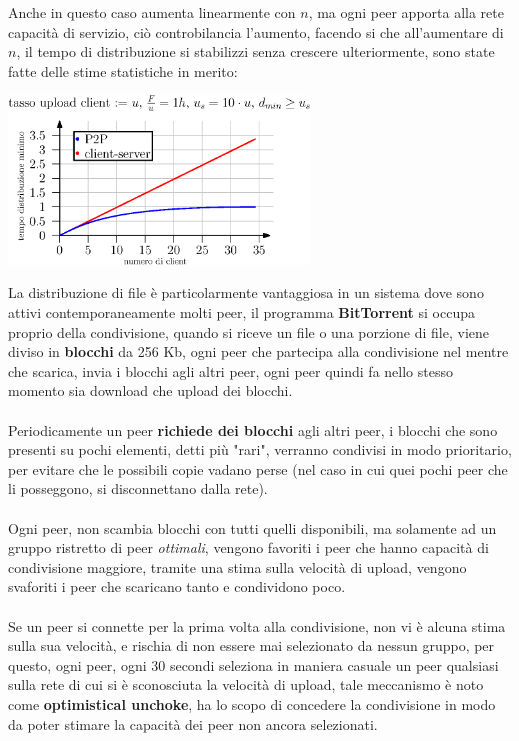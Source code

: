 \documentclass[12pt, letterpaper]{article}
\newcommand{\acc}{\\\hphantom{}\\}
\begin{document}
Anche in questo caso aumenta linearmente con $n$, ma ogni peer apporta alla rete capacità di servizio,
ciò controbilancia l'aumento, facendo si che all'aumentare di $n$, il tempo di distribuzione si stabilizzi
senza crescere ulteriormente, sono state fatte delle stime statistiche in merito:\begin{center}
    \includegraphics[width=0.6\textwidth ]{images/p2pTime.eps}
\end{center}
La distribuzione di file è particolarmente vantaggiosa in un sistema dove sono attivi contemporaneamente
molti peer, il programma \textbf{BitTorrent} si occupa proprio della condivisione, quando si riceve un
file o una porzione di file, viene diviso in \textbf{blocchi} da 256 Kb, ogni peer che partecipa alla condivisione nel
mentre che scarica, invia i blocchi agli altri peer, ogni peer quindi fa nello stesso momento sia
download che upload dei blocchi.\acc
Periodicamente un peer \textbf{richiede dei blocchi} agli altri peer, i blocchi che sono presenti su pochi elementi, detti
più "rari", verranno condivisi in modo prioritario, per evitare che le possibili copie vadano perse (nel caso
in cui quei pochi peer che li posseggono, si disconnettano dalla rete).\acc
Ogni peer, non scambia blocchi con tutti quelli disponibili, ma solamente ad un gruppo ristretto di peer
\textit{ottimali}, vengono favoriti i peer che hanno capacità di condivisione maggiore, tramite una
stima sulla velocità di upload, vengono svaforiti i peer che
scaricano tanto e condividono poco.\acc
Se un peer si connette per la prima volta alla condivisione, non vi è alcuna stima sulla sua velocità, e rischia
di non essere mai selezionato da nessun gruppo, per questo, ogni peer, ogni 30 secondi seleziona in
maniera casuale un peer qualsiasi sulla rete di cui si è sconosciuta la
velocità di upload, tale meccanismo è noto come \textbf{optimistical unchoke},
ha lo scopo di concedere la condivisione in modo da poter stimare la capacità dei peer non ancora selezionati.
\end{document}
